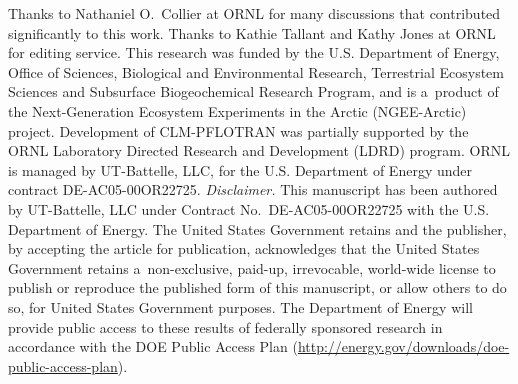 \documentclass[gmdd, online, hvmath]{copernicus}
\begin{document}







\begin{acknowledgements}

      Thanks to Nathaniel O.~Collier at ORNL for many discussions that
      contributed significantly to this work. Thanks to Kathie Tallant and
      Kathy Jones at ORNL for editing service. This research was funded by
      the U.S. Department of Energy, Office of Sciences, Biological and
      Environmental Research, Terrestrial Ecosystem Sciences and Subsurface
      Biogeochemical Research Program, and is a~product of the
      Next-Generation Ecosystem Experiments in the Arctic (NGEE-Arctic)
      project. Development of CLM-PFLOTRAN was partially supported by the
      ORNL Laboratory Directed Research and Development (LDRD) program. ORNL
      is managed by UT-Battelle, LLC, for the U.S. Department of Energy
      under contract DE-AC05-00OR22725.  \hack{\newline}
\hack{\newline}    \hack{\noindent}\textit{Disclaimer.}
 This manuscript has been authored by UT-Battelle, LLC under Contract
      No.~DE-AC05-00OR22725 with the U.S. Department of Energy.  The United
      States Government retains and the publisher, by accepting the article
      for publication, acknowledges that the United States Government
      retains a~non-exclusive, paid-up, irrevocable, world-wide license to
      publish or reproduce the published form of this manuscript, or allow
      others to do so, for United States Government purposes.  The
      Department of Energy will provide public access to these results of
      federally sponsored research in accordance with the DOE Public Access
      Plan (\url{http://energy.gov/downloads/doe-public-access-plan}).
\end{acknowledgements}
\end{document}
